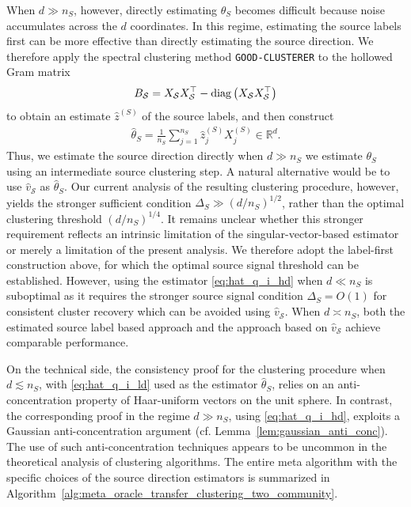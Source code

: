 \documentclass[10pt]{article}
\newcommand{\R}{\mathbb R}
\newcommand{\diag}{\operatorname{diag}}
\newcommand{\wh}{\widehat}
\newcommand{\calS}{\mathcal S}
\newcommand{\src}{S}
\newcommand{\thetaS}{\theta_{\src}}
\newcommand{\nS}{n_{\src}}
\newcommand{\Xsrc}{X^{(\src)}}
\newcommand{\DeltaS}{\Delta_{\src}}
\begin{document}
When $d\gg \nS$, however, directly estimating $\thetaS$ becomes difficult because noise accumulates across the $d$ coordinates. In this regime, estimating the source labels first can be more effective than directly estimating the source direction. We therefore apply the spectral clustering method \texttt{GOOD-CLUSTERER} to the hollowed Gram matrix
\[
B_{\cal S}=X_{\cal S}X_{\cal S}^{\top}-\diag\left(X_{\cal S}X_{\cal S}^{\top}\right)
\]
to obtain an estimate $\wh z^{(\src)}$ of the source labels, and then construct
\begin{align}
\label{eq:hat_q_i_hd}
\wh\theta_S=\frac{1}{\nS}\sum_{j=1}^{\nS}\wh z^{(\src)}_j\Xsrc_j \in \R^d.
\end{align}
Thus, we estimate the source direction directly when $d\gg \nS$ we estimate $\thetaS$ using an intermediate source clustering step. A natural alternative would be to use $\wh v_{\calS}$ as $\wh\theta_S$. Our current analysis of the resulting clustering procedure, however, yields the stronger sufficient condition $\DeltaS\gg(d/\nS)^{1/2}$, rather than the optimal clustering threshold $(d/\nS)^{1/4}$. It remains unclear whether this stronger requirement reflects an intrinsic limitation of the singular-vector-based estimator or merely a limitation of the present analysis. We therefore adopt the label-first construction above, for which the optimal source signal threshold can be established. However, using the estimator \eqref{eq:hat_q_i_hd} when $d \ll \nS$ is suboptimal as it requires the stronger source signal condition $\DeltaS=O(1)$ for consistent cluster recovery which can be avoided using $\wh v_{\calS}$. When $d \asymp \nS$, both the estimated source label based approach and the approach based on $\wh{v}_{\calS}$ achieve comparable performance. 

On the technical side, the consistency proof for the clustering procedure when $d\lesssim \nS$, with \eqref{eq:hat_q_i_ld} used as the estimator
$\wh\theta_S$, relies on an anti-concentration property of Haar-uniform vectors on the unit sphere. In contrast, the corresponding proof in the regime $d\gg \nS$, using \eqref{eq:hat_q_i_hd}, exploits a Gaussian
anti-concentration argument (cf. Lemma~\ref{lem:gaussian_anti_conc}). The use of such anti-concentration techniques appears to be uncommon in the theoretical analysis of clustering algorithms. The entire meta algorithm with the specific choices of the source direction estimators is summarized in
Algorithm~\ref{alg:meta_oracle_transfer_clustering_two_community}.
\end{document}
